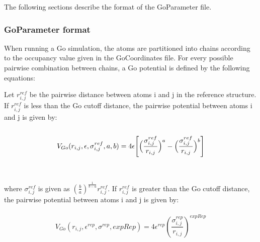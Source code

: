 The following sections describe the format of the GoParameter file.
\subsubsection{GoParameter format}

When running a Go simulation, the atoms are partitioned into chains according to the occupancy value given in the GoCoordinates file.
For every possible pairwise combination between chains, a Go potential is defined by the following equations:

Let $r^{ref}_{i,j}$ be the pairwise distance between atoms i and j in the reference structure.
If $r^{ref}_{i,j}$ is less than the Go cutoff distance, the pairwise potential between atoms i and j is given by: \\\\
$$V_{Go}(r_{i,j},\epsilon,\sigma^{ref}_{i,j},a,b)
 = 4 \epsilon \Biggl[ \Bigl( \frac{\sigma^{ref}_{i,j}} {r_{i,j}} \Bigr)^a
 - \Bigl( \frac{\sigma^{ref}_{i,j}} {r_{i,j}} \Bigr)^b \Biggr]$$ \\\\
where $\sigma^{ref}_{i,j}$ is given as $\left(\frac{b}{a}\right)^{\frac{1}{b-a}}r^{ref}_{i,j}$.
If $r^{ref}_{i,j}$ is greater than the Go cutoff distance, the pairwise potential between atoms i and j is given by: \\\\ 
$$V_{Go}(r_{i,j},\epsilon^{rep},\sigma^{rep},expRep) = 4 \epsilon^{rep} (\frac{\sigma^{rep}_{i,j}}{r_{i,j}})^{expRep}$$ 

